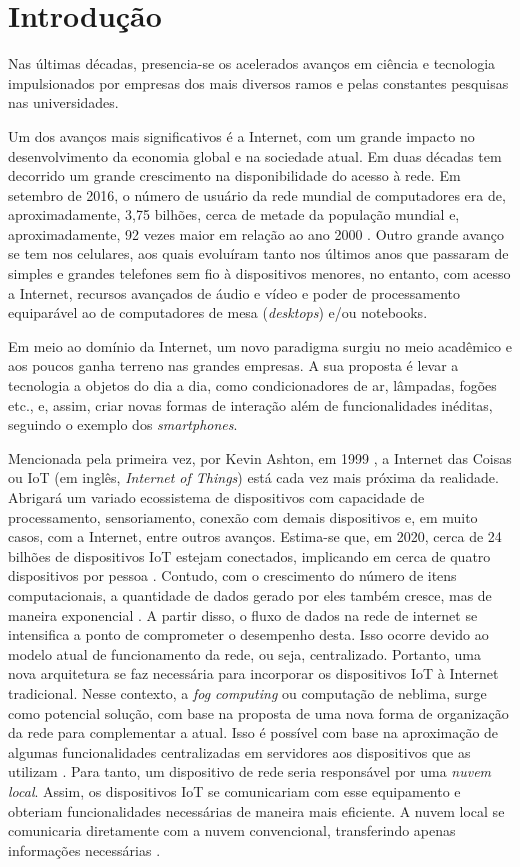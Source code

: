 \chapter{Introdução}

Nas últimas décadas, presencia-se os acelerados avanços em ciência e tecnologia impulsionados por empresas dos mais diversos ramos e pelas constantes pesquisas nas universidades. 

Um dos avanços mais significativos é a Internet, com um grande impacto no desenvolvimento da economia global e na sociedade atual. Em duas décadas tem decorrido um grande crescimento na disponibilidade do acesso à rede. Em setembro de 2016, o número de usuário da rede mundial de computadores era de, aproximadamente, 3,75 bilhões, cerca de metade da população mundial e, aproximadamente, 92 vezes maior em relação ao ano 2000 \cite{Stats2017}.  Outro grande avanço se tem nos celulares, aos quais evoluíram tanto nos últimos anos que passaram de simples e grandes telefones sem fio à dispositivos menores, no entanto, com acesso a Internet, recursos avançados de áudio e vídeo e poder de processamento equiparável ao de computadores de mesa (\textit{desktops}) e/ou notebooks.

Em meio ao domínio da Internet, um novo paradigma surgiu no meio acadêmico e aos poucos ganha terreno nas grandes empresas. A sua proposta é levar a tecnologia a objetos do dia a dia, como condicionadores de ar, lâmpadas, fogões etc., e, assim, criar novas formas de interação além de funcionalidades inéditas, seguindo o exemplo dos \textit{smartphones}. 

Mencionada pela primeira vez, por Kevin Ashton, em 1999 \cite{Ashton2009}, a Internet das Coisas ou IoT (em inglês, \textit{Internet of Things}) está cada vez mais próxima da realidade. Abrigará um variado ecossistema de dispositivos com capacidade de processamento, sensoriamento, conexão com demais dispositivos e, em muito casos, com a Internet, entre outros avanços. Estima-se que, em 2020, cerca de 24 bilhões de dispositivos IoT estejam conectados, implicando em cerca de quatro dispositivos por pessoa \cite{Meola2016}.   
Contudo, com o crescimento do número de itens computacionais, a quantidade de dados gerado por eles também cresce, mas de maneira exponencial \cite{Chiang2016}. A partir disso, o fluxo de dados na rede de internet se intensifica a ponto de comprometer o desempenho desta. Isso ocorre devido ao modelo atual de funcionamento da rede, ou seja, centralizado. Portanto, uma nova arquitetura se faz necessária para incorporar os dispositivos IoT à Internet tradicional. %
Nesse contexto, a \textit{fog computing} ou computação de neblima, surge como potencial solução, com base na proposta de uma nova forma de organização da rede para complementar a atual. Isso é possível com base na aproximação de algumas funcionalidades centralizadas em servidores aos dispositivos que as utilizam \cite{Chiang2016}. Para tanto, um dispositivo de rede seria responsável por uma \textit{nuvem local}. Assim, os dispositivos IoT se comunicariam com esse equipamento e obteriam funcionalidades necessárias de maneira mais eficiente. A nuvem local se comunicaria diretamente com a nuvem convencional, transferindo apenas informações necessárias \cite{Syed2016}.

